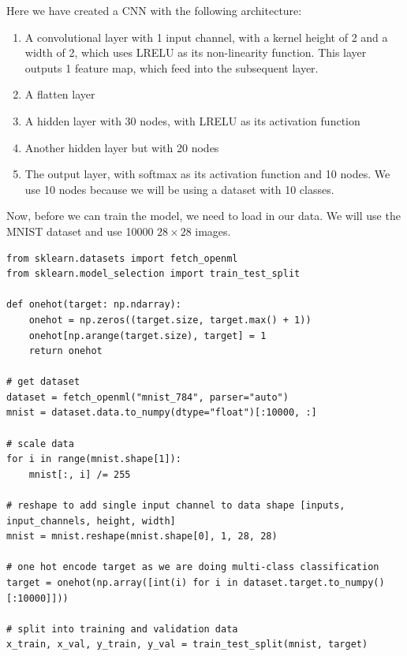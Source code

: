 \documentclass[%
oneside,                 %
final,                   %
10pt]{article}
\begin{document}
Here we have created a CNN with the following architecture:

\begin{enumerate}
\item A convolutional layer with 1 input channel, with a kernel height of 2 and a width of 2, which uses LRELU as its non-linearity function. This layer outputs 1 feature map, which feed into the subsequent layer.

\item A flatten layer

\item A hidden layer with 30 nodes, with LRELU as its activation function

\item Another hidden layer but with 20 nodes

\item The output layer, with softmax as its activation function and 10 nodes. We use 10 nodes because we will be using a dataset with 10 classes.
\end{enumerate}

\noindent
Now, before we can train the model, we need to load in our data. We
will use the MNIST dataset and use 10000 $28 \times  28$ images.


























\begin{verbatim}
from sklearn.datasets import fetch_openml
from sklearn.model_selection import train_test_split

def onehot(target: np.ndarray):
    onehot = np.zeros((target.size, target.max() + 1))
    onehot[np.arange(target.size), target] = 1
    return onehot

# get dataset
dataset = fetch_openml("mnist_784", parser="auto")
mnist = dataset.data.to_numpy(dtype="float")[:10000, :]

# scale data
for i in range(mnist.shape[1]):
    mnist[:, i] /= 255
    
# reshape to add single input channel to data shape [inputs, input_channels, height, width]
mnist = mnist.reshape(mnist.shape[0], 1, 28, 28)

# one hot encode target as we are doing multi-class classification
target = onehot(np.array([int(i) for i in dataset.target.to_numpy()[:10000]]))

# split into training and validation data
x_train, x_val, y_train, y_val = train_test_split(mnist, target)

\end{verbatim}
\end{document}
